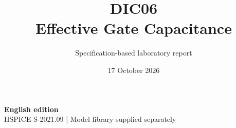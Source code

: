\documentclass[11pt,a4paper]{article}
\title{\color{accent}DIC06\\[4pt]Effective Gate Capacitance}
\author{Specification-based laboratory report}
\date{17 October 2026}
\begin{document}
\maketitle
\begin{center}\small\textbf{English edition}\\
HSPICE S-2021.09 \quad | \quad Model library supplied separately
\end{center}


\end{document}
